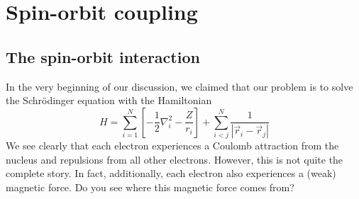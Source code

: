 \chapter{Spin-orbit coupling} \label{ch:6}

\section{The spin-orbit interaction}
In the very beginning of our discussion, we claimed that our problem is to solve the
Schr\"{o}dinger equation with the Hamiltonian
\begin{equation} \label{eq:Hamitt}
H = \sum_{i=1}^N \left[ -\frac{1}{2} \nabla_i^2 - \frac{Z}{r_i} \right] + \sum_{i<j}^N \frac{1}{|\vec{r}_i - \vec{r}_j|}
\end{equation}
We see clearly that each electron experiences a Coulomb
attraction from the nucleus and repulsions from all other electrons. However, this is
not quite the complete story. In fact, additionally, each electron also experiences a (weak)
magnetic force. Do you see where this magnetic force comes from?

